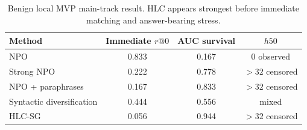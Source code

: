 \begin{table}[h]
\centering
\caption{Benign local MVP main-track result. HLC appears strongest before immediate matching and answer-bearing stress.}
\label{tab:benign-main}
\begin{tabular}{lccc}
\toprule
Method & Immediate $r@0$ & AUC survival & $h50$ \\
\midrule
NPO & 0.833 & 0.167 & 0 observed \\
Strong NPO & 0.222 & 0.778 & $>32$ censored \\
NPO + paraphrases & 0.167 & 0.833 & $>32$ censored \\
Syntactic diversification & 0.444 & 0.556 & mixed \\
HLC-SG & 0.056 & 0.944 & $>32$ censored \\
\bottomrule
\end{tabular}
\end{table}
